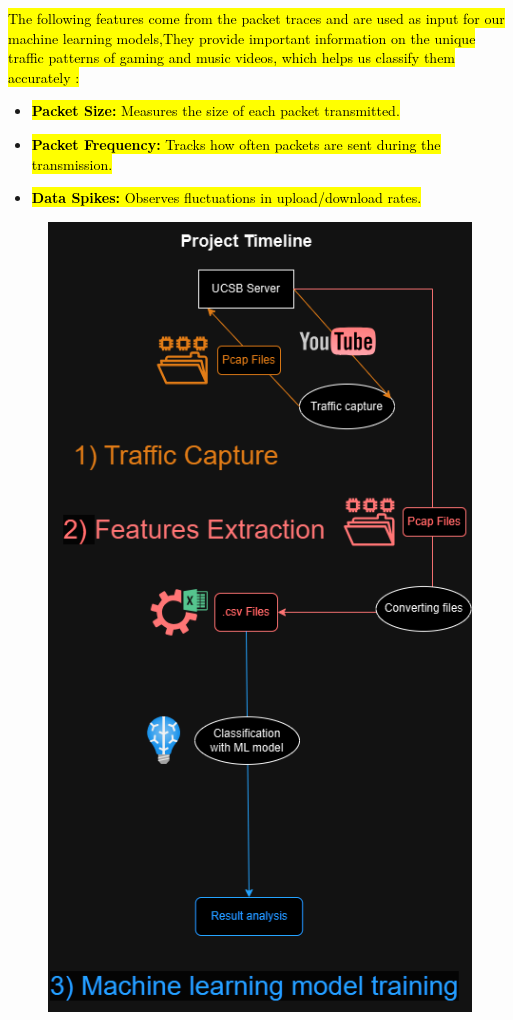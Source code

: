 \hl{The following features come from the packet traces and are used as input for our machine learning models,They provide important information on the unique traffic patterns of gaming and music videos, which helps us classify them accurately :}
\begin{itemize}
    \item \hl{\textbf{Packet Size:} Measures the size of each packet transmitted.}
    \item \hl{\textbf{Packet Frequency:} Tracks how often packets are sent during the transmission.}
    \item \hl{\textbf{Data Spikes:} Observes fluctuations in upload/download rates.}
\end{itemize}

\begin{figure}[ht]
    \centering
    \includegraphics[width=1.0\linewidth]{timeline_diagram.png}
    \label{fig:your_label}
\end{figure}


